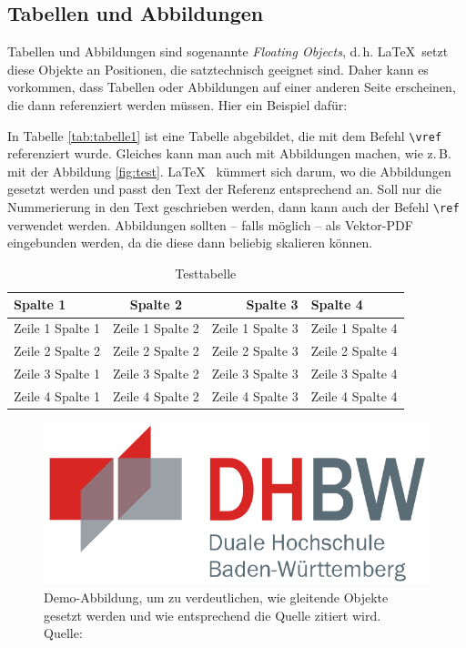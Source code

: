 \subsection{Tabellen und Abbildungen}
Tabellen und Abbildungen sind sogenannte \textit{Floating Objects}, d.\,h. \LaTeX\ setzt diese Objekte an Positionen, die satztechnisch geeignet sind. Daher kann es vorkommen, dass Tabellen oder Abbildungen auf einer anderen Seite erscheinen, die dann referenziert werden müssen. Hier ein Beispiel dafür:

In Tabelle \vref{tab:tabelle1} ist eine Tabelle abgebildet, die mit dem Befehl \texttt{\textbackslash vref} referenziert wurde. Gleiches kann man auch mit Abbildungen
machen, wie z.\,B. mit der Abbildung \vref{fig:test}. \LaTeX~ kümmert sich darum, wo die Abbildungen gesetzt werden und passt den Text der Referenz entsprechend an. Soll nur die Nummerierung in den Text geschrieben werden, dann kann auch der Befehl \texttt{\textbackslash ref} verwendet werden.
Abbildungen sollten -- falls möglich -- als Vektor-PDF eingebunden
werden, da die diese dann beliebig skalieren können.

\lipsum[1]
\begin{table}
	\centering
	\begin{tabular}{p{3cm}crl}
		\textbf{Spalte 1} & \textbf{Spalte 2} & \textbf{Spalte 3} & \textbf{Spalte 4}\\\toprule
		Zeile 1 Spalte 1 &  Zeile 1 Spalte 2 & Zeile 1 Spalte 3 & Zeile 1 Spalte 4\\
		Zeile 2 Spalte 2 &  Zeile 2 Spalte 2 & Zeile 2 Spalte 3 & Zeile 2 Spalte 4\\\midrule
		Zeile 3 Spalte 1 &  Zeile 3 Spalte 2 & Zeile 3 Spalte 3 & Zeile 3 Spalte 4\\
		Zeile 4 Spalte 1 &  Zeile 4 Spalte 2 & Zeile 4 Spalte 3 & Zeile 4 Spalte 4\\\bottomrule
	\end{tabular}
	\caption[Testtabelle]{\label{tab:tabelle1}Testtabelle}
\end{table}
\lipsum[1-2]

\begin{figure}
	\centering
	\includegraphics[width=\textwidth,height=\textheight,keepaspectratio]{img/dhbw_logo.png}
	\captionsetup{format=hang}
	\caption[Optionaler Kurztitel für das Abbildunggsverzeichnis]{\label{fig:test}Demo-Abbildung, um zu verdeutlichen, wie gleitende Objekte gesetzt werden und wie entsprechend die Quelle zitiert wird. \\Quelle: \cite[][S. 223]{TD15}}
\end{figure}

